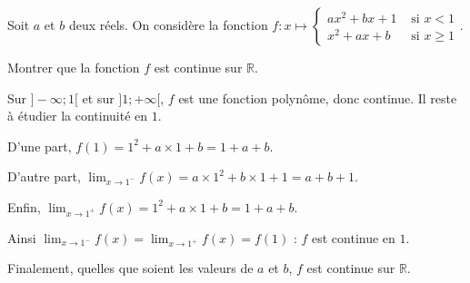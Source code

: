 \documentclass[11pt,a4paper]{article}  %
\begin{document}
	\exerciceDS{}
	
	Soit $a$ et $b$ deux réels. On considère la fonction $f: x \mapsto\left\{\begin{array}{ll}a x^2+b x+1 & \text { si } x<1 \\ x^2+a x+b & \text { si } x \geqslant 1\end{array}\right.$.
	
	Montrer que la fonction $f$ est continue sur $\mathbb{R}$.
	
	\begin{corrBox}
		Sur $]-\infty ; 1[$ et sur $] 1 ;+\infty[$, $f$ est une fonction polynôme, donc continue. Il reste à étudier la continuité en $1$.
		
		D'une part, $f(1)=1^2+a \times 1+b=1+a+b$.
		
		D'autre part, $\displaystyle\lim _{x \to 1^{-}} f(x)=a \times 1^2+b \times 1+1=a+b+1$.
		
		Enfin, $\displaystyle\lim _{x \to 1^{+}} f(x)=1^2+a\times 1+b=1+a+b$.
		
		Ainsi $\displaystyle\lim _{x \to 1^{-}} f(x)=\lim _{x \to 1^{+}} f(x)=f(1)$ : $f$ est continue en $1$.
		
		Finalement, quelles que soient les valeurs de $a$ et $b$, $f$ est continue sur $\mathbb{R}$.
	\end{corrBox}
	
	\exerciceDS{}
	
\end{document}
